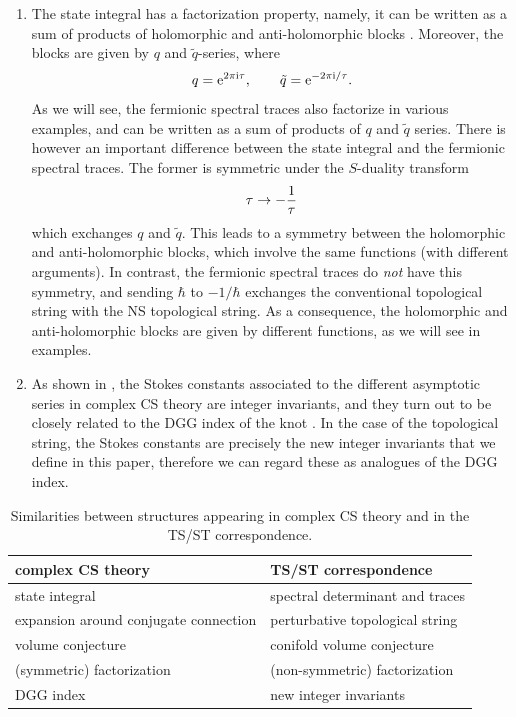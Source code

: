 \documentclass[a4paper,11pt]{article}
\theoremstyle{definition}
\newcommand{\re}{{\rm e}}
\newcommand{\ri}{{\rm i}}
\def\tq{{\tilde{q}}}
\begin{document}
\begin{enumerate}
\item The state integral has a factorization property, namely, it can be written as a sum of products of 
holomorphic and anti-holomorphic blocks \cite{pasq,bdp,dimofte-state,GK-qseries,ggm1,ggm2}. Moreover, the blocks
are given by $q$ and $\tq$-series, where 
%
\begin{equation}
q= \re^{2 \pi \ri \tau}, \qquad \tq =   \re^{-2 \pi \ri /\tau}. 
\end{equation}
%
As we will see, the fermionic spectral traces also factorize in various examples, and can be written as a sum of products of $q$ and $\tq$ series. There is however an important 
difference between the state integral and the fermionic spectral traces. The former is symmetric under the $S$-duality transform
%
\begin{equation}
\tau \rightarrow -{1\over\tau} 
\end{equation}
%
which exchanges $q$ and $\tq$. This leads to a symmetry between the holomorphic and anti-holomorphic blocks, which involve the same functions (with different arguments). 
In contrast, the fermionic spectral traces do {\it not} have this symmetry, and sending $\hbar$ to $-1/\hbar$ exchanges the conventional topological string with the NS topological string. As a consequence, the holomorphic and anti-holomorphic blocks are given by different functions, as we will see in examples.

\item As shown in \cite{ggm1,ggm2}, the Stokes constants associated to the different asymptotic series in complex CS theory are integer invariants, and they turn out to be closely related to the DGG index of the knot \cite{dgg-index}. In the case of the topological string, the Stokes constants are precisely the new integer invariants that we define in this paper, therefore we can regard these as analogues of the DGG index. 

 \end{enumerate}


\begin{table}
\begin{center}
\begin{tabular}{|| l || l||}
\hline
 complex CS theory  & TS/ST correspondence\\ \hline\hline
state integral &  spectral determinant and traces \\ \hline
expansion around conjugate connection &  perturbative topological string \\ \hline
volume conjecture&  conifold volume conjecture\\ \hline
(symmetric) factorization & (non-symmetric) factorization  \\\hline
DGG index &new integer invariants \\ \hline
\end{tabular}
\end{center}
\caption{Similarities between structures appearing in complex CS theory and in the TS/ST correspondence.}
\label{table-sim}
\end{table}
%
\end{document}
